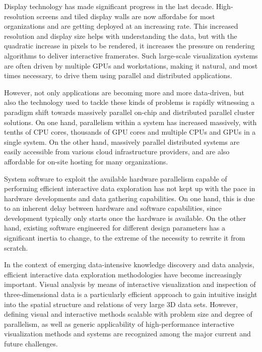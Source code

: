Display technology has made significant progress in the last decade.
High-resolution screens and tiled display walls are now affordabe for most
organizations and are getting deployed at an increasing rate. This increased
resolution and display size helps with understanding the data, but with the
quadratic increase in pixels to be rendered, it increases the pressure on
rendering algorithms to deliver interactive framerates. Such large-scale
visualization systems are often driven by multiple GPUs and workstations,
making it natural, and most times necessary, to drive them using parallel and
distributed applications.

However, not only applications are becoming more and more data-driven, but also
the technology used to tackle these kinds of problems is rapidly witnessing a
paradigm shift towards massively parallel on-chip and distributed parallel
cluster solutions. On one hand, parallelism within a system has increased
massively, with tenths of CPU cores, thousands of GPU cores and multiple CPUs
and GPUs in a single system. On the other hand, massively parallel distributed
systems are easily accessible from various cloud infrastructure providers, and
are also affordable for on-site hosting for many organizations.

System software to exploit the available hardware parallelism capable of
performing efficient interactive data exploration has not kept up with the pace
in hardware developments and data gathering capabilities. On one hand, this is
due to an inherent delay between hardware and software capabilities, since
development typically only starts once the hardware is available. On the other
hand, existing software engineered for different design parameters has a
significant inertia to change, to the extreme of the necessity to rewrite it
from scratch.

In the context of emerging data-intensive knowledge discovery and data analysis,
efficient interactive data exploration methodologies have become increasingly
important. Visual analysis by means of interactive visualization and inspection
of three-dimensional data is a particularly efficient approach to gain intuitive
insight into the spatial structure and relations of very large 3D data sets.
However, defining visual and interactive methods scalable with problem size and
degree of parallelism, as well as generic applicability of high-performance
interactive visualization methods and systems are recognized among the major
current and future challenges.

